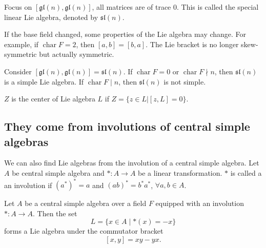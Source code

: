 \begin{example}
    Focus on $ [\mathfrak{gl}(n),\mathfrak{gl}(n)] $, all matrices are of trace 0. This is called the special linear Lie algebra, denoted by $ \mathfrak{sl}(n) $.
\end{example}

\begin{example}
    If the base field changed, some properties of the Lie algebra may change. For example, if $\operatorname{char}F=2$, then $[a,b]=[b,a]$. The Lie bracket is no longer skew-symmetric but actually symmetric.

    Consider $ [\mathfrak{gl}(n),\mathfrak{gl}(n)]=\mathfrak{sl}(n) $. If $\operatorname{char}F=0$ or $\operatorname{char}F \nmid n$, then $\mathfrak{sl}(n)$ is a simple Lie algebra. If $\operatorname{char}F\mid n$, then $\mathfrak{sl}(n)$ is not simple.
\end{example}

\begin{definition}
    $ Z $ is the center of Lie algebra $ L $ if $ Z=\{ z \in L | [z,L]=0 \} $.
\end{definition}

\subsection{They come from involutions of central simple algebras}

We can also find Lie algebras from the involution of a central simple algebra. Let $ A $ be central simple algebra and $ *: A \to A $ be a linear transformation. $ * $ is called a an involution if $ (a^*)^* =a $ and $ (ab)^*=b^*a^* $, $ \forall a,b \in A $.

\begin{proposition}
    Let $A$ be a central simple algebra over a field $F$ equipped with an involution
    $* : A \to A$. Then the set
    \[
        L=\{x\in A \mid *(x)=-x\}
    \]
    forms a Lie algebra under the commutator bracket
    \[
        [x,y]=xy-yx .
    \]
\end{proposition}


